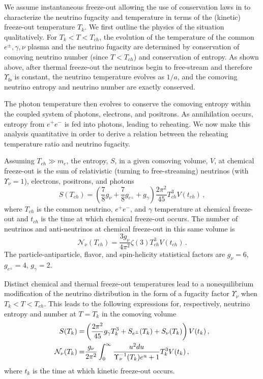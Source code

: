 We assume instantaneous freeze-out allowing the use of conservation laws in  to characterize the neutrino fugacity and temperature in terms of the (kinetic) freeze-out temperature $T_k$. We first outline the physics of the situation qualitatively. For $T_k<T<T_{ch}$, the evolution of the temperature of the common $e^\pm,\gamma,\nu$ plasma and the neutrino fugacity are determined by conservation of comoving neutrino number (since $T<T_{ch}$) and conservation of entropy. As shown above, after thermal freeze-out the neutrinos begin to free-stream and therefore $\Upsilon_\mathrm{fs}$ is constant, the neutrino temperature evolves as $1/a$, and the comoving neutrino entropy and neutrino number are exactly conserved. 

The photon temperature then evolves to conserve the comoving entropy within the coupled system of photons, electrons, and positrons. As annihilation occurs, entropy from $e^+e^-$ is fed into photons, leading to reheating. We now make this analysis quantitative in order to derive a relation between the reheating temperature ratio and neutrino fugacity.

Assuming $T_{ch}\gg m_e$, the entropy, $S$, in a given comoving volume, $V$, at chemical freeze-out is the sum of relativistic (turning to free-streaming) neutrinos (with $\Upsilon_\nu=1$), electrons, positrons, and photons
\begin{equation}
S(T_{ch})=\left(\frac{7}{8}g_\nu+\frac{7}{8}g_{e^\pm} +g_\gamma \right)\frac{2\pi^2}{45} T_{ch}^3V(t_{ch})\,,
\end{equation}
where $T_{ch}$ is the common neutrino, $e^+e^-$, and $\gamma$ temperature at chemical freeze-out and $t_{ch}$ is the time at which chemical freeze-out occurs. The number of neutrinos and anti-neutrinos at chemical freeze-out in this same volume is
\begin{equation}
\mathcal{N}_\nu(T_{ch})=\frac{3g_\nu}{4\pi^2}\zeta(3)T_{ch}^3V(t_{ch})\,.
\end{equation}
The particle-antiparticle, flavor, and spin-helicity statistical factors are $g_\nu=6$, $g_{e^\pm}=4$, $g_\gamma=2$.

Distinct chemical and thermal freeze-out temperatures lead to a nonequilibrium modification of the neutrino distribution in the form of a fugacity factor $\Upsilon_\nu$ when $T_k<T<T_{ch}$. This leads to the following expressions for, respectively, neutrino entropy and number at $T=T_k$ in the comoving volume
\begin{align}
S(T_k)=&\left(\frac{2\pi^2}{45}g_\gamma T_k^3+S_{e^\pm}(T_k)+S_{\nu}(T_k)\right)V(t_k)\,,\\
\mathcal{N}_{\nu}(T_k)=&\frac{g_\nu}{2\pi^2}\int_0^\infty \frac{u^2 du}{\Upsilon_\nu^{-1}(T_k)e^u+1}T_k^3V(t_k)\,,\notag
\end{align}
where $t_k$ is the time at which kinetic freeze-out occurs.

